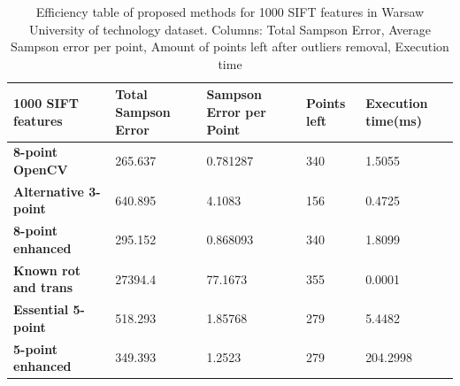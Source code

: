 \begin{table}[p]
\centering
\begin{adjustbox}{width=1\linewidth}
\begin{tabular}{l|l|l|l|l}
\textbf{1000 SIFT features}  & \textbf{Total Sampson Error} & \textbf{Sampson Error per Point} & \textbf{Points left} & \textbf{Execution time(ms)} \\ \hline
\textbf{8-point OpenCV}      & 265.637             & 0.781287                & 340         & 1.5055             \\ \hline
\textbf{Alternative 3-point} & 640.895             & 4.1083                  & 156         & 0.4725             \\ \hline
\textbf{8-point enhanced}    & 295.152             & 0.868093                & 340         & 1.8099             \\ \hline
\textbf{Known rot and trans} & 27394.4             & 77.1673                 & 355         & 0.0001             \\ \hline
\textbf{Essential 5-point}   & 518.293             & 1.85768                 & 279         & 5.4482             \\ \hline
\textbf{5-point enhanced}    & 349.393             & 1.2523                  & 279         & 204.2998           \\
\end{tabular}
\end{adjustbox}
\caption[Efficiency table of proposed methods for 1000 SIFT features in Warsaw University of technology dataset]{Efficiency table of proposed methods for 1000 SIFT features in Warsaw University of technology dataset. Columns: Total Sampson Error, Average Sampson error per point, Amount of points left after outliers removal, Execution time}
\label{table:Efficiency1000Sift}
\end{table}

